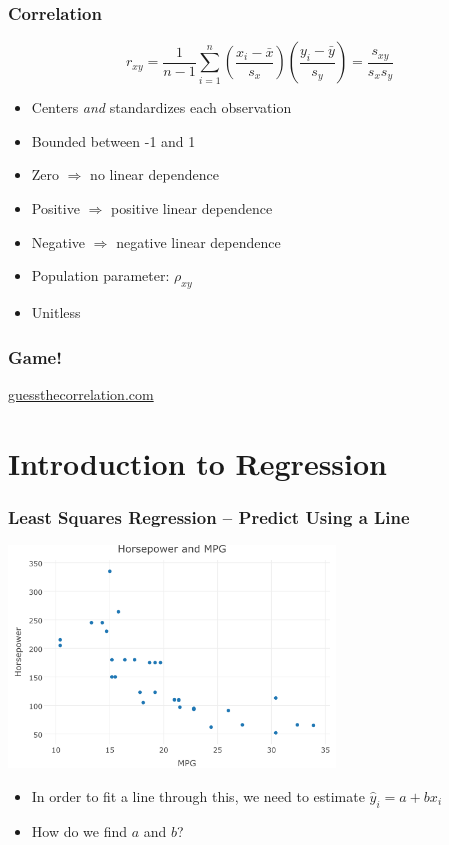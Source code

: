 \documentclass{beamer}
\begin{document}
\begin{frame}
\frametitle{Correlation}
	$$
	r_{xy} = \frac{1}{n - 1} \sum_{i = 1}^n \left(\frac{x_i  - \bar{x}}{s_x}\right)\left(\frac{y_i - \bar{y}}			{s_y}\right) = \frac{s_{xy}}{s_x s_y}
	$$
	\begin{itemize}
		\item Centers \emph{and} standardizes each observation 
		\item Bounded between -1 and 1
		\item Zero $\Rightarrow$ no linear dependence
		\item Positive $\Rightarrow$ positive linear dependence
		\item Negative $\Rightarrow$ negative linear dependence
		\item Population parameter: $\rho_{xy}$
		\item Unitless
	\end{itemize}
\end{frame}

\begin{frame}
\frametitle{Game!}
	\url{guessthecorrelation.com}
\end{frame}

\section{Introduction to Regression}
\begin{frame}
\frametitle{Least Squares Regression -- Predict Using a Line}
	\begin{center}
		\includegraphics[width = 0.65\textwidth]{./images/cars.png}
	\end{center}
	\begin{itemize}
		\item In order to fit a line through this, we need to estimate $\hat{y}_i = a + bx_i$
		\item How do we find $a$ and $b$?
	\end{itemize}
\end{frame}
	
\end{document}

